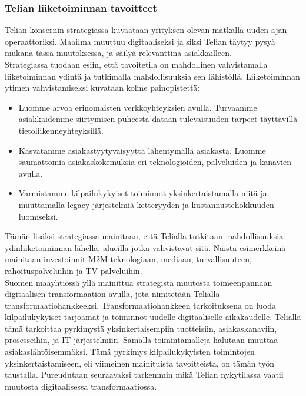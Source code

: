 \documentclass[finnish,12pt,a4paper,pdftex]{article}
\begin{document}
\subsubsection{Telian liiketoiminnan tavoitteet}

Telian konsernin strategiassa \citeyearpar{telia} kuvaataan yrityksen olevan matkalla uuden ajan operaattoriksi. Maailma muuttuu digitaaliseksi ja siksi Telian täytyy pysyä mukana tässä muutoksessa, ja säilyä relevanttina asiakkailleen.  \\

Strategiassa tuodaan esiin, että tavoitetila on mahdollinen vahvistamalla liiketoiminnan ydintä ja tutkimalla mahdollisuuksia sen lähistöllä. Liiketoiminnan ytimen vahvistamiseksi kuvataan kolme painopistettä:
\begin{itemize}
    \item Luomme arvoa erinomaisten verkkoyhteyksien avulla. Turvaamme asiakkaidemme siirtymisen puheesta dataan tulevaisuuden tarpeet täyttävillä tietoliikenneyhteyksillä.
    \item Kasvatamme asiakastyytyväisyyttä lähentymällä asiakasta. Luomme saumattomia asiakaskokemuksia eri teknologioiden, palveluiden ja kanavien avulla.
    \item Varmistamme kilpailukykyiset toiminnot yksinkertaistamalla niitä ja muuttamalla legacy-järjestelmiä ketteryyden ja kustannustehokkuuden luomiseksi.
\end{itemize}

Tämän lisäksi strategiassa mainitaan, että Telialla tutkitaan mahdollisuuksia ydinliiketoiminnan lähellä, alueilla jotka vahvistavat sitä. Näistä esimerkkeinä mainitaan investoinnit M2M-teknologiaan, mediaan, turvallisuuteen, rahoituspalveluihin ja TV-palveluihin.\\

 Suomen maayhtiössä yllä mainittua strategista muutosta toimeenpannaan digitaalisen transformaation avulla, jota nimitetään Telialla transformaatiohankkeeksi. Transformaatiohankkeen tarkoituksena on luoda kilpailukykyiset tarjoamat ja toiminnot uudelle digitaaliselle aikakaudelle. Telialla tämä tarkoittaa pyrkimystä yksinkertaisempiin tuotteisiin, asiakaskanaviin, prosesseihin, ja IT-järjestelmiin. Samalla toimintamalleja halutaan muuttaa asiakaslähtöisemmäksi. Tämä pyrkimys kilpailukykyisten toimintojen yksinkertaistamiseen, eli viimeinen mainituista tavoitteista, on tämän työn taustalla. Pureudutaan seuraavaksi tarkemmin mikä Telian nykytilassa vaatii muutosta digitaalisessa transformaatiossa.
\end{document}
